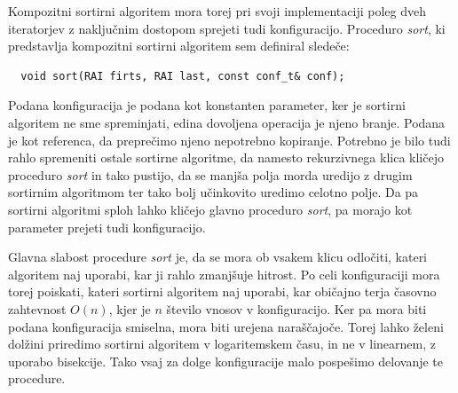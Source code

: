 \documentclass[a4paper,oneside]{article}
\begin{document}
Kompozitni sortirni algoritem mora torej pri svoji implementaciji poleg dveh 
iteratorjev z naključnim dostopom sprejeti tudi konfiguracijo. Proceduro \emph{sort},
ki predstavlja kompozitni sortirni algoritem sem definiral sledeče: 

\begin{lstlisting}
  void sort(RAI firts, RAI last, const conf_t& conf);
\end{lstlisting}

Podana konfiguracija je podana kot konstanten parameter, ker je sortirni algoritem ne sme
spreminjati, edina dovoljena operacija je njeno branje. Podana je kot referenca, da
preprečimo njeno nepotrebno kopiranje.
Potrebno je bilo tudi rahlo spremeniti ostale sortirne algoritme, da namesto rekurzivnega
klica kličejo proceduro \emph{sort} in tako pustijo, da se manjša polja morda uredijo z
drugim sortirnim algoritmom ter tako bolj učinkovito uredimo celotno polje. Da pa
sortirni algoritmi sploh lahko kličejo glavno proceduro \emph{sort}, pa morajo kot
parameter prejeti tudi konfiguracijo.

Glavna slabost procedure \emph{sort} je, da se mora ob vsakem klicu odločiti, kateri
algoritem naj uporabi, kar ji rahlo zmanjšuje hitrost. Po celi konfiguraciji mora torej
poiskati, kateri sortirni algoritem naj uporabi, kar običajno terja časovno zahtevnost
$O(n)$, kjer je $n$ število vnosov v konfiguracijo. Ker pa mora biti podana konfiguracija
smiselna, mora biti urejena naraščajoče. Torej lahko želeni dolžini priredimo sortirni
algoritem v logaritemskem času, in ne v linearnem, z uporabo bisekcije. Tako vsaj za dolge
konfiguracije malo pospešimo delovanje te procedure.
\end{document}
